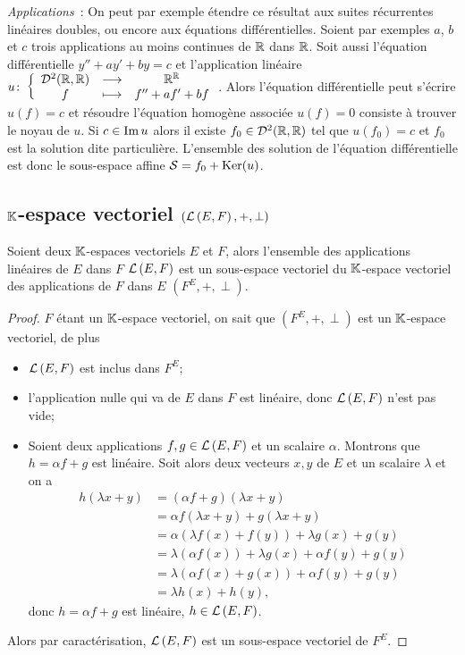 \emph{Applications}~: On peut par exemple étendre ce résultat aux suites 
récurrentes linéaires doubles, ou encore aux équations différentielles. Soient 
par exemples \(a\), \(b\) et \(c\) trois applications au moins continues de 
\(\mathbb{R}\) dans \(\mathbb{R}\). Soit aussi l'équation différentielle \(y''+ay'+by=c\) et 
l'application linéaire \(u\colon\left\{\begin{array}{ccc}\mathcal{D}^{2}(\mathbb{R},\mathbb{R}) & \longrightarrow &\mathbb{R}^{\mathbb{R}}\\f & \longmapsto & f''+af'+bf\end{array}\right.\). 
Alors l'équation différentielle peut s'écrire \(u(f)=c\) et résoudre l'équation 
homogène associée \(u(f)=0\) consiste à trouver le noyau de \(u\). Si \(c \in 
\operatorname{Im}{u}\) alors il existe \(f_0 \in \mathcal{D}^{2}(\mathbb{R},\mathbb{R})\) tel que \(u(f_0)=c\) et 
\(f_0\) est la solution dite particulière. L'ensemble des solution de l'équation 
différentielle est donc le sous-espace affine \(\mathcal{S}=f_0 + \operatorname{Ker}(u)\).

\subsection{\(\mathbb{K}\)-espace vectoriel \((\mathcal{L}\left(E,F\right), +, \perp)\)}

\begin{theo}
  Soient deux \(\mathbb{K}\)-espaces vectoriels \(E\) et \(F\), alors l'ensemble des 
  applications linéaires de \(E\) dans \(F\) \(\mathcal{L}\left(E,F\right)\) est un sous-espace 
  vectoriel du \(\mathbb{K}\)-espace vectoriel des applications de \(F\) dans \(E\) 
  \((F^E,+,\perp)\).
\end{theo}

\begin{proof}
  \(F\) étant un \(\mathbb{K}\)-espace vectoriel, on sait que \((F^E,+,\perp)\) est un 
  \(\mathbb{K}\)-espace vectoriel, de plus
  \begin{itemize}
    \item \(\mathcal{L}\left(E,F\right)\) est inclus dans \(F^E\);
    \item l'application nulle qui va de \(E\) dans \(F\) est linéaire, donc 
      \(\mathcal{L}\left(E,F\right)\) n'est pas vide;
    \item Soient deux applications \(f,g \in \mathcal{L}\left(E,F\right)\) et un scalaire 
      \(\alpha\). Montrons que \(h=\alpha f +g\) est linéaire. Soit alors deux 
      vecteurs \(x,y\) de \(E\) et un scalaire \(\lambda\) et on a
      \begin{align}
        h(\lambda x+y)&=(\alpha f+g)(\lambda x+y) \\
        &=\alpha f(\lambda x+y)  +g(\lambda x+y) \\
        &=\alpha(\lambda f(x)+f(y)) +\lambda g(x)+g(y) \\
        &=\lambda(\alpha f(x)) + \lambda g(x) + \alpha f(y) +g(y)\\
        &=\lambda(\alpha f(x)+g(x))+\alpha f(y) +g(y) \\
        &=\lambda h(x)+h(y),
      \end{align}
      donc \(h=\alpha f+g\) est linéaire, \(h \in \mathcal{L}\left(E,F\right)\).
  \end{itemize}
  Alors par caractérisation, \(\mathcal{L}\left(E,F\right)\) est un sous-espace vectoriel de 
  \(F^E\).
\end{proof}

